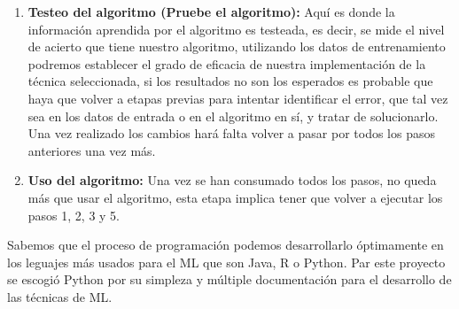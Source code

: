 \begin{enumerate}
\item \textbf{Testeo del algoritmo (Pruebe el algoritmo):} Aquí es donde la información aprendida por el algoritmo es testeada, es decir, se mide el nivel de acierto que tiene nuestro algoritmo, utilizando los datos de entrenamiento podremos establecer el grado de eficacia de nuestra implementación de la técnica seleccionada, si los resultados no son los esperados es probable que haya que volver a etapas previas para intentar identificar el error, que tal vez sea en los datos de entrada o en el algoritmo en sí, y tratar de solucionarlo. Una vez realizado los cambios hará falta volver a pasar por todos los pasos anteriores una vez más.
\item \textbf{Uso del algoritmo:} Una vez se han consumado todos los pasos, no queda
más que usar el algoritmo, esta etapa implica tener que volver a ejecutar los pasos 1, 2, 3 y 5.
\end{enumerate}

\par Sabemos que el proceso de programación podemos desarrollarlo óptimamente en los leguajes más usados para el ML que son Java, R o Python. Par este proyecto se escogió Python por su simpleza y múltiple documentación para el desarrollo de las técnicas de ML.\\












